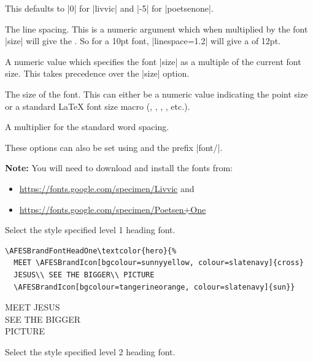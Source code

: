 \documentclass[a4paper]{l3doc}
\begin{document}
\begin{description}
    This defaults to |0| for |livvic| and |-5| for |poetsenone|.
  \item[linespace] The line spacing. This is a numeric argument which when
    multiplied by the font |size| will give the . So for a
    10pt font, |linespace=1.2| will give a  of 12pt.
  \item[relsize] A numeric value which specifies the font |size| as a multiple
    of the current font size. This takes precedence over the |size| option.
  \item[size] The size of the font. This can either be a numeric value
    indicating the point size or a standard \LaTeX{} font size macro
    (, , , , etc.).
  \item[wordspace] A multiplier for the standard word spacing.
\end{description}

These options can also be set using  and the prefix
|font/|.

\textbf{Note:} You will need to download and install the fonts from:
\begin{itemize}
  \item \url{https://fonts.google.com/specimen/Livvic} and
  \item \url{https://fonts.google.com/specimen/Poetsen+One}
\end{itemize}

\begin{function}{\AFESBrandFontHeadOne}
  Select the style specified level 1 heading font.
\end{function}

\begin{lstlisting}
\AFESBrandFontHeadOne\textcolor{hero}{%
  MEET \AFESBrandIcon[bgcolour=sunnyyellow, colour=slatenavy]{cross}
  JESUS\\ SEE THE BIGGER\\ PICTURE
  \AFESBrandIcon[bgcolour=tangerineorange, colour=slatenavy]{sun}}
\end{lstlisting}

{\AFESBrandFontHeadOne \textcolor{hero}{MEET
  JESUS\\ SEE THE
 BIGGER\\ PICTURE }\par}

\begin{function}{\AFESBrandFontHeadTwo}
  Select the style specified level 2 heading font.
\end{function}
 
\end{document}
